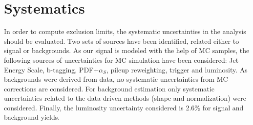 \begin{table*}[htbH]
\begin{center}
\caption{Mean value and standard deviation from linear fit, from gaussian fit of MC mass points after full selection. In the last column the yields for each mass point are presented from the integration around one sigma of the mean value from the linear fit. The error of the yields are presented as a percentage of the nominal value.\label{tab:LinearSignalWidths}}
\end{center}
\end{table*}

\section{Systematics}
\label{sec:sys}

In order to compute exclusion limits, the systematic uncertainties in the analysis should be evaluated. Two sets of sources have been identified, related either to signal or backgrounds. As our signal is modeled with the help of MC samples, the following sources of uncertainties for MC simulation have been considered: Jet Energy Scale, b-tagging, PDF+$\alpha_{S}$, pileup reweighting, trigger and luminosity. As backgrounds were derived from data, no systematic uncertainties from MC corrections are considered. For background estimation only systematic uncertainties related to the data-driven methods (shape and normalization) were considered. Finally, the luminosity uncertainty considered is 2.6\% for signal and background yields. 

